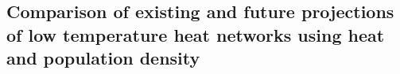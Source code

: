 \subsection{Comparison of existing and future projections of low temperature heat networks using heat and population density}\label{res:5}















%
%
%
%
%



